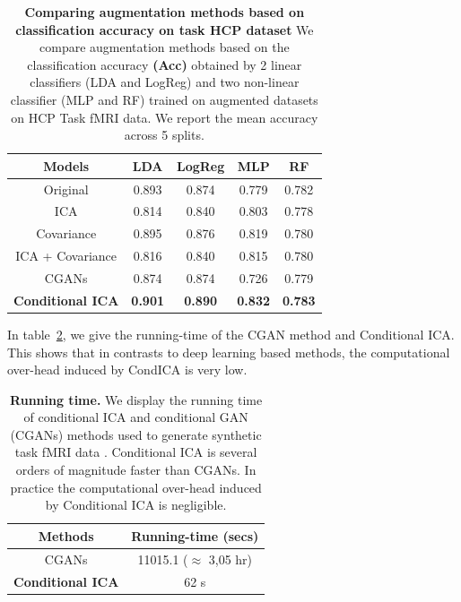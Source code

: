 \begin{table}
  \setlength{\tabcolsep}{0.23em}
  \begin{center}
    \begin{tabular}{c|c|c|c | c}
      \hline
      Models & LDA & LogReg & MLP& RF\\
      \hline
      Original           & 0.893 & 0.874 &  0.779 &0.782 \\
    ICA                & 0.814 & 0.840 &  0.803 &0.778\\
    Covariance         & 0.895 & 0.876 &  0.819 &0.780\\
    ICA + Covariance   & 0.816 & 0.840 &  0.815 &0.780\\
    CGANs              & 0.874 & 0.874 &   0.726&0.779 \\
    \hline                                      
      \textbf{Conditional ICA} &  \textbf{0.901} & \textbf{0.890} & \textbf{0.832} &  \textbf{0.783} \\
    \hline\hline
\end{tabular}
\end{center}
\caption{\textbf{Comparing augmentation methods based on classification accuracy on task
      HCP dataset} We compare augmentation methods based on the classification
    accuracy \textbf{(Acc)} obtained by 2 linear classifiers (LDA and LogReg) and two
    non-linear classifier (MLP and RF) trained on augmented datasets on HCP
    Task fMRI data. We report the mean accuracy across 5 splits.}
  \label{condica:tab3}
\end{table}

In table~\ref{app:runningtime:tab}, we give the running-time of the CGAN
method and Conditional ICA. This shows that in contrasts to deep learning based
methods, the computational over-head induced by CondICA is very low.
\begin{table}
  \begin{center}
    \begin{tabular}{|c|c|}
      \hline
      Methods & Running-time (secs)
      \\ \hline
      CGANs  & 11015.1 ($\approx$ 3,05 hr)
      \\
      \textbf{Conditional ICA}  & 62 s 
      \\
      \hline
    \end{tabular}
  \end{center}
  \caption{\textbf{Running time.} We display the running time of conditional ICA
    and conditional GAN (CGANs) methods used
    to generate synthetic task fMRI data . Conditional ICA is several orders of magnitude faster than
    CGANs. In practice the computational over-head induced by Conditional ICA is negligible.}\label{app:runningtime:tab}
\end{table}





